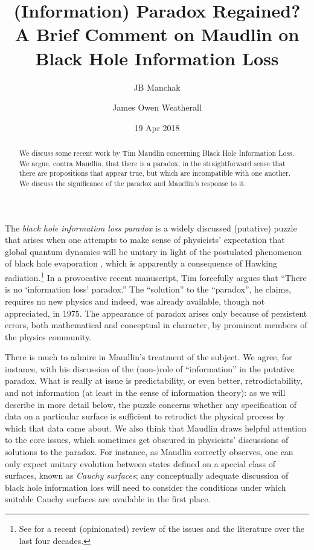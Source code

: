 \documentclass[authoryear,12pt,3p]{jowarticle}
\begin{document}
\date{19 Apr 2018}
\begin{frontmatter}
\title{(Information) Paradox Regained? \\ A Brief Comment on Maudlin on Black Hole Information Loss}
\author{JB Manchak}
\author{James Owen Weatherall}
\address{Department of Logic and Philosophy of Science\\ University of California, Irvine}

\begin{abstract}
We discuss some recent work by Tim Maudlin concerning Black Hole Information Loss.  We argue, contra Maudlin, that there is a paradox, in the straightforward sense that there are propositions that appear true, but which are incompatible with one another.  We discuss the significance of the paradox and Maudlin's response to it.
\end{abstract}

\end{frontmatter}

The \emph{black hole information loss paradox} \citep{HawkingIL} is a widely discussed (putative) puzzle that arises when one attempts to make sense of physicists' expectation that global quantum dynamics will be unitary in light of the postulated phenomenon of black hole evaporation \citep{HawkingR1,HawkingR2,UnruhBHE}, which is apparently a consequence of Hawking radiation.\footnote{See \citet{Unruh+Wald} for a recent (opinionated) review of the issues and the literature over the last four decades.}  In a provocative recent manuscript, Tim \citet{Maudlin} forcefully argues that ``There is no `information loss' paradox.''  The ``solution'' to the ``paradox'', he claims, requires no new physics and indeed, was already available, though not appreciated, in 1975.  The appearance of paradox arises only because of persistent errors, both mathematical and conceptual in character, by prominent members of the physics community.

There is much to admire in Maudlin's treatment of the subject.  We agree, for instance, with his discussion of the (non-)role of ``information'' in the putative paradox.  What is really at issue is predictability, or even better, retrodictability, and not information (at least in the sense of information theory): as we will describe in more detail below, the puzzle concerns whether any specification of data on a particular surface is sufficient to retrodict the physical process by which that data came about.  We also think that Maudlin draws helpful attention to the core issues, which sometimes get obscured in physicists' discussions of solutions to the paradox. For instance, as Maudlin correctly observes, one can only expect unitary evolution between states defined on a special class of surfaces, known as \emph{Cauchy surfaces}; any conceptually adequate discussion of black hole information loss will need to consider the conditions under which suitable Cauchy surfaces are available in the first place.
\end{document}
